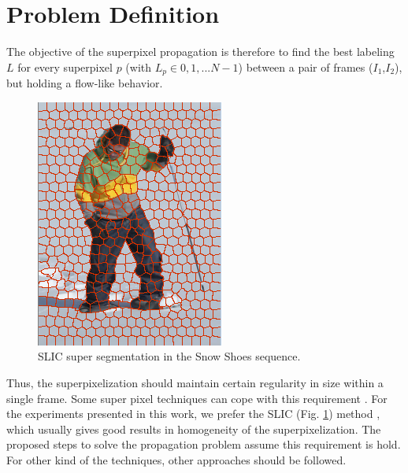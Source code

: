 \section{Problem Definition}
\label{sec:proposed_approach}

The objective of the superpixel propagation is
therefore to find the best labeling $L$ for every superpixel $p$
(with $L_p \in {0,1,...N-1}$) between a pair
of frames ($I_{1}$,$I_{2}$), but holding a flow-like behavior.
   \begin{figure}[thpb]
      \centering
      \includegraphics[height=0.22\textheight]{images/segmentation.png}
      \caption{SLIC super segmentation in the Snow Shoes sequence.}
      \label{figurelabel_segmentation}
   \end{figure}
Thus, the superpixelization should maintain certain
regularity in size within a single frame. Some super
pixel techniques can cope with this requirement \cite{c9}\cite{c10}.
For the experiments presented in this work, we prefer
the SLIC (Fig. \ref{figurelabel_segmentation}) method \cite{c9}, which usually gives
good results in homogeneity of the superpixelization.
The proposed steps to solve the propagation problem
assume this requirement is hold. For other kind of the
techniques, other approaches should be followed.


